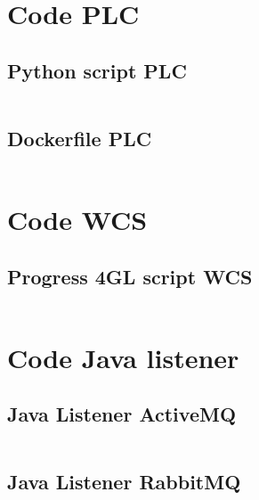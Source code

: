 
\section{Code PLC}\label{sec:code_plc}

\subsection{Python script PLC} \label{sec:script_plc}
\inputminted{python3}{../tests/plc/plc-simulator.py}
\newpage

\subsection{Dockerfile PLC} \label{sec:docker_plc}
\inputminted{python3}{../tests/plc/Dockerfile}

\section{Code WCS}\label{sec:code_wcs}

\subsection{Progress 4GL script WCS} \label{sec:script_wcs}
\inputminted{python3}{../tests/wcs/wcs.p}

\section{Code Java listener}\label{sec:code_java_listener} 

\subsection{Java Listener ActiveMQ}\label{sec:listener_activemq}
\inputminted{java}{../tests/listener/activemq-listener/demo/src/main/java/com/example/ActiveMQSocketBridge.java}

\subsection{Java Listener RabbitMQ}\label{sec:listener_rabbitmq}
\inputminted{java}{../tests/listener/rabbitmq-listener/rabbitmq-plc-listener/src/main/java/com/listener/RabbitMQSocketBridge.java}

